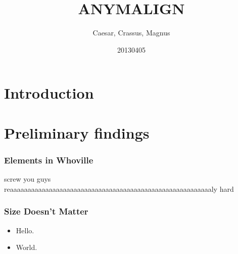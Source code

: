 

\date{ 20130405 } %
\title{ANYMALIGN}
\author{Caesar, Crassus, Magnus }




\section{Introduction}{

  \begin{frame}
    \titlepage
  \end{frame}
}

\section{Preliminary findings}{
  \begin{frame}
    \frametitle{Elements in Whoville}
    screw you guys \\
    reaaaaaaaaaaaaaaaaaaaaaaaaaaaaaaaaaaaaaaaaaaaaaaaaaaaaaaaaaly hard
  \end{frame}
}

\begin{frame}[fragile]
  \frametitle{Size Doesn't Matter}
  \begin{itemize}
    \item Hello.
    \item World.
  \end{itemize}
\end{frame}


